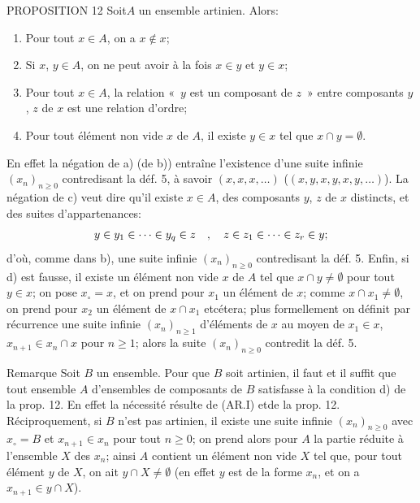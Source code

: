 \documentclass[10pt]{../fichiers-configuration-latex/smfart}
\def\labelenumi{(\theenumi)}
\begin{document}
\begin{enonce*}{PROPOSITION 12}
Soit\pageoriginale $A$ un ensemble artinien. Alors:
\begin{enumerate}
\renewcommand{\theenumi}{\alph{enumi}}
\renewcommand{\labelenumi}{\theenumi)}
\item Pour tout $x\in A$, on a $x\not\in x$;

\item Si $x$, $y\in A$, on ne peut avoir à la fois $x\in y$ et $y\in
x$;

\item Pour tout $x\in A$, la relation « $y$ est un composant de $z$ » entre composants $y$, $z$ de $x$ est une relation d'ordre;

\item Pour tout élément non vide $x$ de $A$, il existe $y\in x$
tel que $x\cap y=∅$.
\end{enumerate}
\end{enonce*}
En effet la négation de a) (\resp de b)) entraîne l'existence d'une
suite infinie $(x_n)_{n\geq 0}$ contredisant la déf. 5, à savoir
$(x,x,x,\ldots)$ (\resp $(x,y,x,y,x,y,\ldots)$). La négation de c)
veut dire qu'il existe $x\in A$, des composants $y$, $z$ de $x$
distincts, et des suites d'appartenances:
$$
y\in y_1\in\dots \in y_q\in z\quad,\quad z\in z_1\in\dots\in z_r\in
y{};
$$
d'où, comme dans b), une suite infinie $(x_n)_{n\geq 0}$
contredisant la déf. 5. Enfin, si d) est fausse, il existe un
élément non vide $x$ de $A$ tel que $x\cap y\neq ∅$ pour
tout $y\in x$; on pose $x_\circ=x$, et on prend pour $x_1$ un
élément de $x$; comme $x\cap x_1\neq ∅$, on prend pour
$x_2$ un élément de $x\cap x_1$ etcétera; plus formellement on
définit par récurrence une suite infinie $(x_n)_{n\geq 1}$
d'éléments de $x$ au moyen de $x_1\in x$, $x_{n+1}\in x_n\cap x$
pour $n\geq 1$; alors la suite $(x_n)_{n\geq 0}$ contredit la déf.
5.

\begin{enonce*}[remark]{Remarque}
Soit $B$ un ensemble. Pour que $B$ soit artinien, il faut et il
suffit que tout ensemble $A$ d'ensembles de composants de $B$
satisfasse à la condition d) de la prop. 12. En effet la nécessité
résulte de (AR.I) et\pageoriginale de la prop. 12. Réciproquement,
si $B$ n'est pas artinien, il existe une suite infinie $(x_n)_{n\geq
0}$ avec $x_{\circ}=B$ et $x_{n+1}\in x_n$ pour tout $n\geq 0$; on
prend alors pour $A$ la partie réduite à l'ensemble $X$ des $x_n$;
ainsi $A$ contient un élément non vide $X$ tel que, pour tout
élément $y$ de $X$, on ait $y\cap X\neq ∅$ (en effet $y$
est de la forme $x_n$, et on a $x_{n+1}\in y\cap X$).
\end{enonce*}
\end{document}

